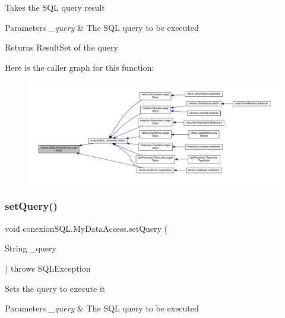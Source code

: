 Takes the S\+QL query result 
\begin{DoxyParams}{Parameters}
{\em \+\_\+query} & The S\+QL query to be executed \\
\hline
\end{DoxyParams}
\begin{DoxyReturn}{Returns}
Result\+Set of the query 
\end{DoxyReturn}
Here is the caller graph for this function\+:
\nopagebreak
\begin{figure}[H]
\begin{center}
\leavevmode
\includegraphics[width=350pt]{classconexion_s_q_l_1_1_my_data_access_ae8d04039a000d2b3e7dc72c99be7c551_icgraph}
\end{center}
\end{figure}
\mbox{\label{classconexion_s_q_l_1_1_my_data_access_a9c57d53829ea15bb0bc59d7647cc6249}} 
\subsubsection{\texorpdfstring{set\+Query()}{setQuery()}}
{\footnotesize\ttfamily void conexion\+S\+Q\+L.\+My\+Data\+Access.\+set\+Query (\begin{DoxyParamCaption}\item[{String}]{\+\_\+query }\end{DoxyParamCaption}) throws S\+Q\+L\+Exception}

Sets the query to execute it 
\begin{DoxyParams}{Parameters}
{\em \+\_\+query} & The S\+QL query to be executed \\
\hline
\end{DoxyParams}


